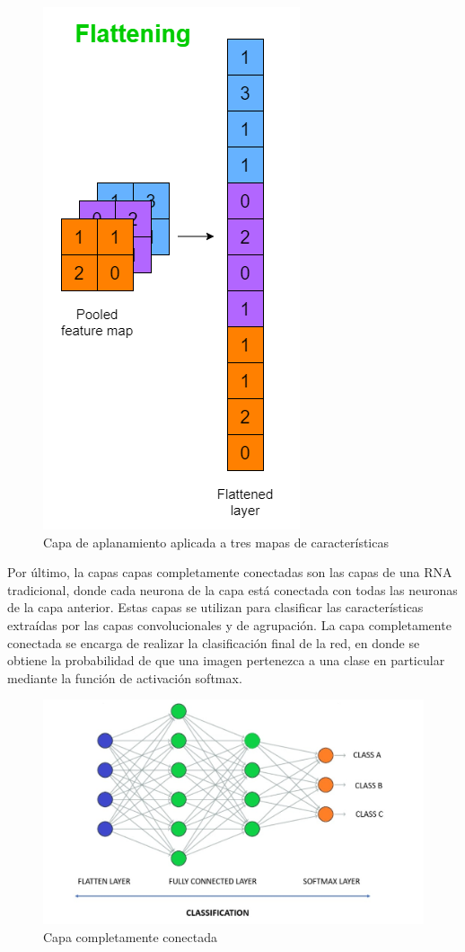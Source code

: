 \begin{figure}[htbp]
    \centering
    \includegraphics[width=0.45\linewidth]{src/figures/flatten.png}
    \caption{Capa de aplanamiento aplicada a tres mapas de características \cite{capa_aplanada}}
    \label{fig:flatten}
\end{figure}

Por último, la capas capas completamente conectadas son las capas
de una RNA tradicional, donde cada neurona de la capa está conectada
con todas las neuronas de la capa anterior. Estas capas se utilizan
para clasificar las características extraídas por las capas convolucionales
y de agrupación. La capa completamente conectada se encarga de realizar
la clasificación final de la red, en donde se obtiene la probabilidad
de que una imagen pertenezca a una clase en particular mediante la 
función de activación softmax.

\begin{figure}[htbp]
    \centering
    \includegraphics[width=0.9\linewidth]{src/figures/fully_connected_layer.png}
    \caption{Capa completamente conectada \cite{capa_conectada}}
    \label{fig:fully_connected}
\end{figure}


